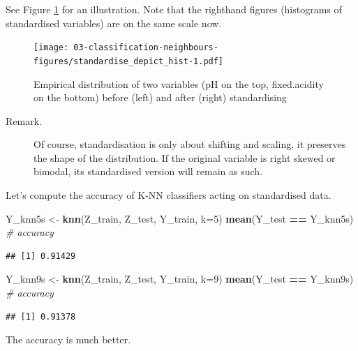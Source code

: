 \documentclass[10pt,b5paper,krantz1]{krantz}
\newenvironment{Shaded}{\begin{snugshade}}{\end{snugshade}}
\newcommand{\CommentTok}[1]{\textcolor[rgb]{0.37,0.37,0.37}{\textit{#1}}}
\newcommand{\DataTypeTok}[1]{\textcolor[rgb]{0.27,0.27,0.27}{#1}}
\newcommand{\DecValTok}[1]{\textcolor[rgb]{0.06,0.06,0.06}{#1}}
\newcommand{\KeywordTok}[1]{\textcolor[rgb]{0.27,0.27,0.27}{\textbf{#1}}}
\newcommand{\NormalTok}[1]{#1}
\newcommand{\OperatorTok}[1]{\textcolor[rgb]{0.43,0.43,0.43}{\textbf{#1}}}
\newcommand{\StringTok}[1]{\textcolor[rgb]{0.5,0.5,0.5}{#1}}
\begin{document}
See Figure \ref{fig:standardise_depict_hist} for an illustration.
Note that the righthand figures (histograms of standardised variables)
are on the same scale now.

\begin{figure}
\hypertarget{fig:standardise_depict_hist}{%
\centering
\texttt{[image: 03-classification-neighbours-figures/standardise\_depict\_hist-1.pdf]}
\caption{Empirical distribution of two variables (pH on the top, fixed.acidity on the bottom) before (left) and after (right) standardising}\label{fig:standardise_depict_hist}
}
\end{figure}

\begin{description}
\item[Remark.]
Of course, standardisation is only about shifting and scaling, it
preserves the shape of the distribution. If the original variable
is right skewed or bimodal, its standardised version will remain as such.
\end{description}

Let's compute the accuracy of K-NN classifiers acting on standardised data.

\begin{Shaded}
\begin{Highlighting}[]
\NormalTok{Y_knn5s <-}\StringTok{ }\KeywordTok{knn}\NormalTok{(Z_train, Z_test, Y_train, }\DataTypeTok{k=}\DecValTok{5}\NormalTok{)}
\KeywordTok{mean}\NormalTok{(Y_test }\OperatorTok{==}\StringTok{ }\NormalTok{Y_knn5s) }\CommentTok{# accuracy}
\end{Highlighting}
\end{Shaded}

\begin{verbatim}
## [1] 0.91429
\end{verbatim}

\begin{Shaded}
\begin{Highlighting}[]
\NormalTok{Y_knn9s <-}\StringTok{ }\KeywordTok{knn}\NormalTok{(Z_train, Z_test, Y_train, }\DataTypeTok{k=}\DecValTok{9}\NormalTok{)}
\KeywordTok{mean}\NormalTok{(Y_test }\OperatorTok{==}\StringTok{ }\NormalTok{Y_knn9s) }\CommentTok{# accuracy}
\end{Highlighting}
\end{Shaded}

\begin{verbatim}
## [1] 0.91378
\end{verbatim}

The accuracy is much better.
\end{document}
